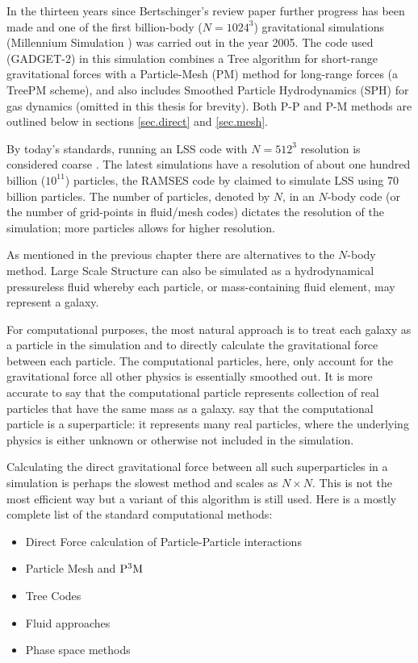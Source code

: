 In the thirteen years since Bertschinger's review paper further progress has been made and one of the first billion-body ($N = 1024^3$) gravitational simulations (Millennium Simulation \citep{bib_spr}) was carried out in the year 2005. The code used (GADGET-2) in this simulation combines a Tree algorithm for short-range gravitational forces with a Particle-Mesh (PM) method for long-range forces (a TreePM scheme), and also includes Smoothed Particle Hydrodynamics (SPH) for gas dynamics (omitted in this thesis for brevity). Both P-P and P-M methods are outlined below in sections \ref{sec.direct} and \ref{sec.mesh}.

By today's standards, running an LSS code with $N = 512^3$ resolution is considered coarse \citep{bib_hmpc}. The latest simulations have a resolution of about one hundred billion ($10^{11}$) particles, the RAMSES code by \citet{bib_tess} claimed to simulate LSS using 70 billion particles. The number of particles, denoted by $N$, in an $N$-body code (or the number of grid-points in fluid/mesh codes) dictates the resolution of the simulation; more particles allows for higher resolution.

As mentioned in the previous chapter there are alternatives to the $N$-body method. Large Scale Structure can also be simulated as a hydrodynamical pressureless fluid whereby each particle, or mass-containing fluid element, may represent a galaxy.

For computational purposes, the most natural approach is to treat each galaxy as a particle in the simulation and to directly calculate the gravitational force between each particle. The computational particles, here, only account for the gravitational force all other physics is essentially smoothed out. It is more accurate to say that the computational particle represents collection of real particles that have the same mass as a galaxy. \citet{bib_he} say that the computational particle is a superparticle: it represents many real particles, where the underlying physics is either unknown or otherwise not included in the simulation.

Calculating the direct gravitational force between all such superparticles in a simulation is perhaps the slowest method and scales as $N \times N$. This is not the most efficient way but a variant of this algorithm is still used. Here is a mostly complete list of the standard computational methods:
\begin{itemize}
\item Direct Force calculation of Particle-Particle interactions
\item Particle Mesh and ${\rm P^3 M}$
\item Tree Codes
\item Fluid approaches
\item Phase space methods
\end{itemize}

